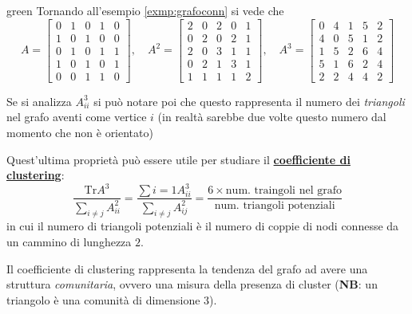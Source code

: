\begin{mybox}{green}{}
Tornando all'esempio \ref{exmp:grafoconn} si vede che
\begin{equation*}
    A = \begin{bmatrix}
    0 & 1 & 0 & 1 & 0 \\
    1 & 0 & 1 & 0 & 0 \\
    0 & 1 & 0 & 1 & 1 \\
    1 & 0 & 1 & 0 & 1 \\
    0 & 0 & 1 & 1 & 0
    \end{bmatrix}, \quad A^2 = \begin{bmatrix}
    2 & 0 & 2 & 0 & 1 \\
    0 & 2 & 0 & 2 & 1 \\
    2 & 0 & 3 & 1 & 1 \\
    0 & 2 & 1 & 3 & 1 \\
    1 & 1 & 1 & 1 & 2
    \end{bmatrix}, \quad A^3 = \begin{bmatrix}
    0 & 4 & 1 & 5 & 2 \\
    4 & 0 & 5 & 1 & 2 \\
    1 & 5 & 2 & 6 & 4 \\
    5 & 1 & 6 & 2 & 4 \\
    2 & 2 & 4 & 4 & 2
    \end{bmatrix}
\end{equation*}
\end{mybox}

Se si analizza $A^3_{ii}$ si può notare poi che questo rappresenta il numero dei \textit{triangoli} nel grafo aventi come vertice $i$ (in realt\`a sarebbe due volte questo numero dal momento che non \`e orientato)

%

Quest'ultima propriet\`a pu\`o essere utile per studiare il \href{https://en.wikipedia.org/wiki/Clustering_coefficient}{\textbf{coefficiente di clustering}}:
\begin{equation}
\frac{\text{Tr} A^3}{\sum_{i \neq j} A^2_{ii}} = \frac{\sum{i=1} A^3_{ii}}{\sum_{i\neq j} A^2_{ij}} = \frac{6 \times \text{num. traingoli nel grafo}}{\text{num. triangoli potenziali}}
\end{equation}
in cui il numero di triangoli potenziali \`e il numero di coppie di nodi connesse da un cammino di lunghezza $2$.

Il coefficiente di clustering rappresenta la tendenza del grafo ad avere una struttura \textit{comunitaria}, ovvero una misura della presenza di cluster (\textbf{NB}: un triangolo \`e una comunit\`a di dimensione $3$).


